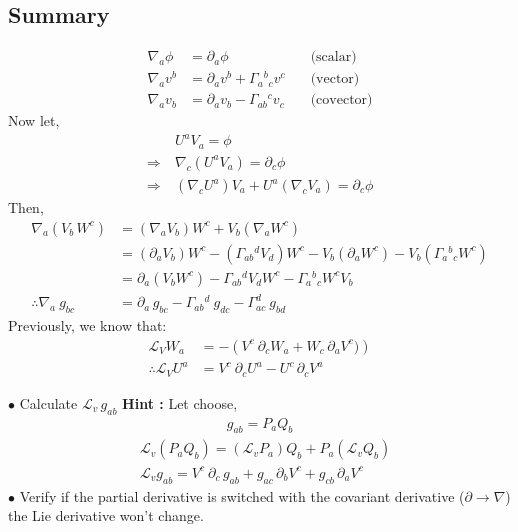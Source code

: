 \documentclass[14pt]{article} %
\begin{document}
\subsection*{Summary}
\begin{align*}
\nabla_a \phi &= \partial_a \phi \quad &\text{(scalar)} \\
\nabla_a v^b &= \partial_a v^b + \Gamma_a{}^b{}_c v^c \quad &\text{(vector)} \\
\nabla_a v_b &= \partial_a v_b - \Gamma_{ab}{}^c v_c \quad &\text{(covector)}
\end{align*}
Now let,
\begin{align*}
& U^a V_a = \phi \\
\Rightarrow~ & \nabla_c (U^a V_a) = \partial_c \phi \\
\Rightarrow~ & (\nabla_c U^a)V_a + U^a (\nabla_c V_a) = \partial_c \phi
\end{align*}
Then,
\begin{align*}
\nabla_a (V_b\,W^c) &= (\nabla_a V_b) W^c + V_b (\nabla_a W^c) \\
&= (\partial_a V_b)W^c - (\Gamma_{ab}{}^d V_d) W^c - V_b(\partial_a W^c) - V_b(\Gamma_a{}^b{}_c W^c) \\
&= \partial_a (V_b W^c)-\Gamma_{ab}{}^d V_d W^c - \Gamma_a{}^b{}_c W^c V_b \\
\therefore \nabla_a~g_{bc} &= \partial_a\,g_{bc} - \Gamma_{ab}{}^d~g_{dc} - \Gamma^d_{ac}~g_{bd}
\end{align*}
Previously, we know that:
\begin{align*}
\mathscr{L}_V W_a &= -\left(V^c~\partial_c W_a + W_c\, \partial_a V^c)\right) \\
\therefore \mathscr{L}_V U^a &= V^c~ \partial_c U^a - U^c\, \partial_c V^a
\end{align*}
\begin{tcolorbox}[ title=HW]
$\bullet$ Calculate $\mathscr{L}_v\, g_{ab}$
\textbf{Hint :} Let choose, 
\begin{align*} g_{ab} = P_a Q_b \end{align*}
\begin{align*}
& \mathscr{L}_v (P_a Q_b) = (\mathscr{L}_vP_a) Q_b + P_a (\mathscr{L}_v Q_b) \\
& \mathscr{L}_v g_{ab} = V^c~ \partial_c\, g_{ab} + g_{ac}\, \partial_b V^c + g_{cb}\, \partial_a V^c
\end{align*}
$\bullet$ Verify if the partial derivative is switched with the covariant derivative ($\partial \rightarrow\nabla$) the Lie derivative won't change.
\end{tcolorbox}
\end{document}
